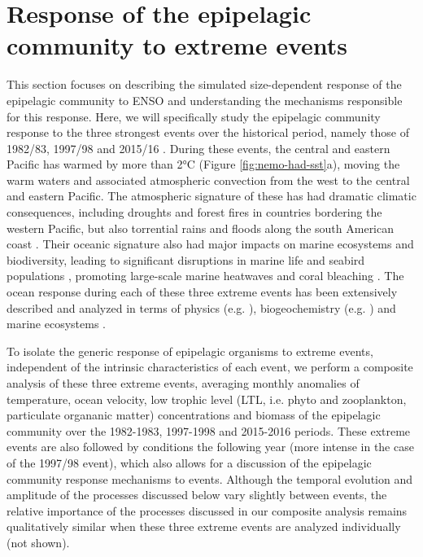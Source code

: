 
\section{Response of the epipelagic community to extreme \nino{} events}
\label{sec:nino-epi}

This section focuses on describing the simulated size-dependent response of the epipelagic community to ENSO and understanding the mechanisms responsible for this response. Here, we will specifically study the epipelagic community response to the three strongest \nino{} events over the historical period, namely those of 1982/83, 1997/98 and 2015/16 \citep{santosoDefiningCharacteristicsENSO2017}. During these events, the central and eastern Pacific has warmed by more than 2°C (Figure \ref{fig:nemo-had-sst}a), moving the warm waters and associated atmospheric convection from the west to the central and eastern Pacific. The atmospheric signature of these \nino{} has had dramatic climatic consequences, including droughts and forest fires in countries bordering the western Pacific, but also torrential rains and floods along the south American coast \citep{caiClimateImpactsNino2020}. Their oceanic signature also had major impacts on marine ecosystems and biodiversity, leading to significant disruptions in marine life and seabird populations \citep{valleImpact198219831987}, promoting large-scale marine heatwaves \citep{holbrookKeepingPaceMarine2020} and coral bleaching \citep{claarGlobalPatternsImpacts2018}.  The ocean response during each of these three extreme events has been extensively described and analyzed in terms of physics (e.g. \citealp{philanderChapter33Simulation1985, lengaigneOceanResponseMarch2002, puyModulationEquatorialPacific2019}), biogeochemistry (e.g. \citealp{barberBiologicalConsequencesNino1983, chavezBiologicalChemicalResponse1999, strammaObservedNinoConditions2016}) and marine ecosystems \citep{glynnNINOSOUTHERNOSCILLATION198219831988, glynnCoralBleachingMortality2001, eakin20142017Globalscale2019}. 

To isolate the generic response of epipelagic organisms to extreme \nino{} events, independent of the intrinsic characteristics of each event, we perform a composite analysis of these three extreme events, averaging monthly anomalies of temperature, ocean velocity, low trophic level  (LTL, i.e. phyto and zooplankton, particulate organanic matter) concentrations and biomass of the epipelagic community over the 1982-1983, 1997-1998 and 2015-2016 periods. These extreme \nino{} events are also followed by \nina{} conditions the following year (more intense in the case of the 1997/98 event), which also allows for a discussion  of the epipelagic community response mechanisms to \nina{} events. Although the temporal evolution and amplitude of the processes discussed below vary slightly between events, the relative importance of the processes discussed in our composite analysis remains qualitatively similar when these three extreme events are analyzed individually (not shown). 

